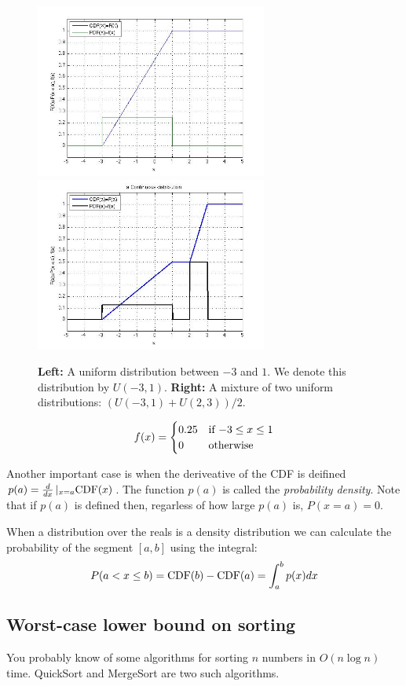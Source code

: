 \begin{figure}[t]
\begin{center}
\includegraphics[width=3in]{figs/Uniform.jpg}
\includegraphics[width=3in]{figs/unifMixture2CDF.jpg}
\end{center}
\caption{{\bf Left:} A uniform distribution between $-3$ and $1$. We
  denote this distribution by $U(-3,1)$. {\bf Right:} A mixture of two
  uniform distributions: $(U(-3,1)+U(2,3))/2$.}
\end{figure}

\[
f(x) = \begin{cases}
0.25 & \mbox{if $ -3 \leq x \leq 1$} \\
0 & \mbox{otherwise}
\end{cases}
\]

Another important case is when the deriveative of the CDF is deifined
$p(a) = \frac{d}{dx}\left|_{x=a} \mbox{CDF}(x)\right.$. The function $p(a)$
is called the {\em probability density}. Note that if $p(a)$ is
defined then, regarless of how large $p(a)$ is, $P(x=a)=0$.

When a distribution over the reals is a density distribution we can
calculate the probability of the segment $[a,b]$ using the integral:
\[
P(a < x \leq b)=\mbox{CDF}(b)-\mbox{CDF}(a)=\int_a^b p(x) dx
\]

\subsection{Worst-case lower bound on sorting}
You probably know of some algorithms for sorting $n$ numbers in
$O(n\log n)$ time. QuickSort and MergeSort are two such algorithms.

